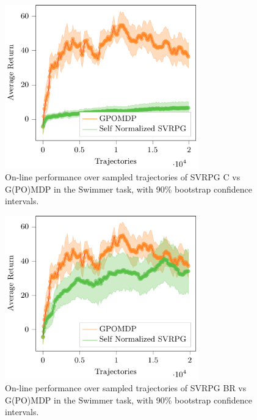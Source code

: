 \begin{figure}[h]
	\begin{minipage}[h]{1\textwidth}
		\centering
		\includegraphics[width=0.75\textwidth]{Images/Experiments/swimmer_GPOMDP_vs_SN_SVRPG_C.pdf}
		\vspace{-0.1in}
		\caption{On-line performance over sampled trajectories of \acs{SVRPG} C vs G(PO)MDP in the Swimmer task, with 90\% bootstrap confidence intervals.}
		\label{fig:swimmerseven}
	\end{minipage}
	\vspace{-0.15in}
\end{figure}

\begin{figure}[h]
	\begin{minipage}[h]{1\textwidth}
		\centering
		\includegraphics[width=0.75\textwidth]{Images/Experiments/swimmer_GPOMDP_vs_SN_SVRPG_B_reuse.pdf}
		\vspace{-0.1in}
		\caption{On-line performance over sampled trajectories of \acs{SVRPG} BR vs G(PO)MDP in the Swimmer task, with 90\% bootstrap confidence intervals.}
		\label{fig:swimmereight}
	\end{minipage}
	\vspace{-0.15in}
\end{figure}


